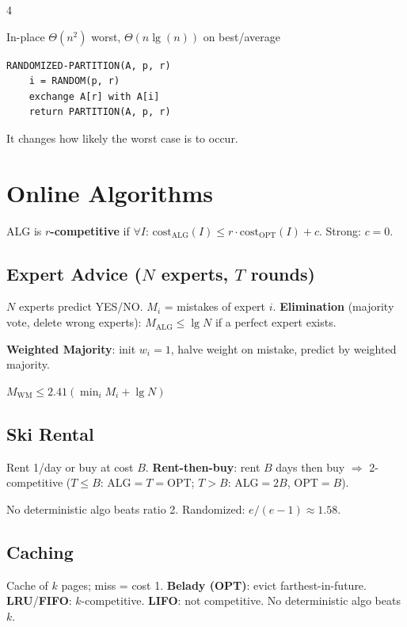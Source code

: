 \documentclass[8pt,a4paper,landscape]{extarticle}
\begin{document}
\begin{multicols*}{4}
\begin{prop}[title=Runtime]
In-place $\Theta(n^2)$ worst, $\Theta(n\lg(n))$ on best/average
\end{prop}

\begin{lstlisting}
RANDOMIZED-PARTITION(A, p, r)
    i = RANDOM(p, r)
    exchange A[r] with A[i]
    return PARTITION(A, p, r)
\end{lstlisting}
It changes how likely the worst case is to occur.

\newcolumn

\section{Online Algorithms}

\begin{defn}[title=Competitive Ratio]
ALG is \textbf{$r$-competitive} if $\forall I$: $\text{cost}_\text{ALG}(I) \leq r \cdot \text{cost}_\text{OPT}(I) + c$. Strong: $c=0$.
\end{defn}

\subsection{Expert Advice ($N$ experts, $T$ rounds)}
$N$ experts predict YES/NO. $M_i$ = mistakes of expert $i$. \textbf{Elimination} (majority vote, delete wrong experts): $M_\text{ALG} \leq \lg N$ if a perfect expert exists.

\textbf{Weighted Majority}: init $w_i=1$, halve weight on mistake, predict by weighted majority.
\begin{thm}
$M_\text{WM} \leq 2.41(\min_i M_i + \lg N)$
\end{thm}

\subsection{Ski Rental}
Rent 1/day or buy at cost $B$. \textbf{Rent-then-buy}: rent $B$ days then buy $\Rightarrow$ 2-competitive ($T\leq B$: ALG$=T=$OPT; $T>B$: ALG$=2B$, OPT$=B$).
\begin{thm}
No deterministic algo beats ratio 2. Randomized: $e/(e{-}1)\approx1.58$.
\end{thm}

\subsection{Caching}
Cache of $k$ pages; miss = cost 1. \textbf{Belady (OPT)}: evict farthest-in-future. \textbf{LRU}/\textbf{FIFO}: $k$-competitive. \textbf{LIFO}: not competitive. No deterministic algo beats $k$.


\end{multicols*}
\end{document}
